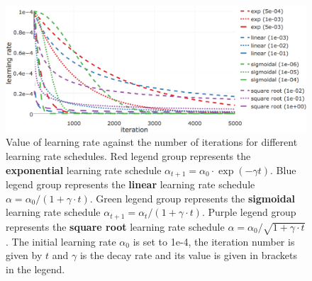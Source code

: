 \documentclass[11pt,a4paper,twoside]{book}
\theoremstyle{definition}
\theoremstyle{definition}
\theoremstyle{remark}
\begin{document}
\begin{figure}

{\centering \includegraphics[width=1\linewidth]{img/full_likelihood/appendix/learning_rate_schedules_alpha0_1e-4_notitle} 

}

\caption{Value of learning rate against the
number of iterations for different learning rate schedules. Red legend
group represents the \textbf{exponential} learning rate schedule
\(\alpha_{t+1} = \alpha_0 \cdot\exp(- \gamma t)\). Blue legend group
represents the \textbf{linear} learning rate schedule
\(\alpha = \alpha_0 / (1 + \gamma \cdot t)\). Green legend group
represents the \textbf{sigmoidal} learning rate schedule
\(\alpha_{t+1} = \alpha_{t} / (1 + \gamma \cdot t)\). Purple legend
group represents the \textbf{square root} learning rate schedule
\(\alpha = \alpha_0 / \sqrt{1 + \gamma \cdot t}\). The initial learning
rate \(\alpha_0\) is set to 1e-4, the iteration number is given by \(t\)
and \(\gamma\) is the decay rate and its value is given in brackets in
the legend.}\label{fig:learning-rate-schedules}
\end{figure}
\end{document}
